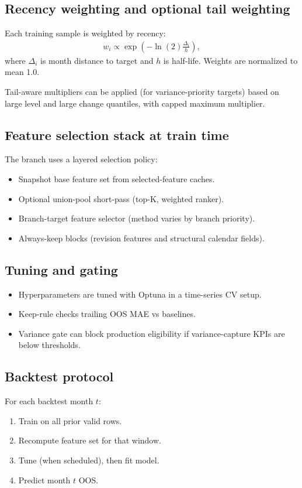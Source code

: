 \documentclass[11pt]{article}
\begin{document}
\subsection{Recency weighting and optional tail weighting}
Each training sample is weighted by recency:
\begin{align}
w_i \propto \exp\left(-\ln(2)\frac{\Delta_i}{h}\right),
\end{align}
where $\Delta_i$ is month distance to target and $h$ is half-life.
Weights are normalized to mean 1.0.

Tail-aware multipliers can be applied (for variance-priority targets) based on large level and large change quantiles, with capped maximum multiplier.

\subsection{Feature selection stack at train time}
The branch uses a layered selection policy:
\begin{itemize}
    \item Snapshot base feature set from selected-feature caches.
    \item Optional union-pool short-pass (top-K, weighted ranker).
    \item Branch-target feature selector (method varies by branch priority).
    \item Always-keep blocks (revision features and structural calendar fields).
\end{itemize}

\subsection{Tuning and gating}
\begin{itemize}
    \item Hyperparameters are tuned with Optuna in a time-series CV setup.
    \item Keep-rule checks trailing OOS MAE vs baselines.
    \item Variance gate can block production eligibility if variance-capture KPIs are below thresholds.
\end{itemize}

\subsection{Backtest protocol}
For each backtest month $t$:
\begin{enumerate}
    \item Train on all prior valid rows.
    \item Recompute feature set for that window.
    \item Tune (when scheduled), then fit model.
    \item Predict month $t$ OOS.
\end{enumerate}
\end{document}
